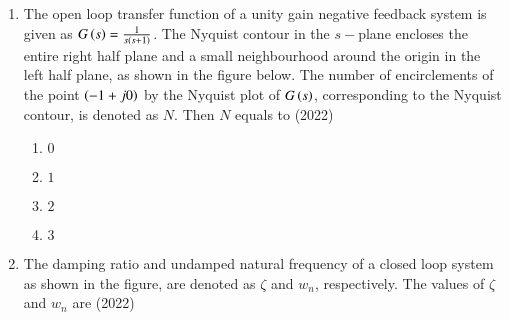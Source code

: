 \documentclass[journal]{IEEEtran}
\begin{document}
\begin{enumerate}
\item The open loop transfer function of a unity gain negative feedback system is given as $G\left(s\right)=\frac{1}{s\left(s+1\right)}$. The Nyquist contour in the $s-$plane encloses the entire right half plane and a small neighbourhood around the origin in the left half plane, as shown in the figure below. The number of encirclements of the point $\left(-1+j0\right)$ by the Nyquist plot of $G\left(s\right)$, corresponding to the Nyquist contour, is denoted as $N$. Then $N$ equals to \hfill(2022)

\begin{multicols}{2}
\begin{enumerate}
\item $0$
\item $1$
\item $2$
\item $3$
\end{enumerate}
\end{multicols}


\item The damping ratio and undamped natural frequency of a closed loop system as shown in the figure, are denoted as $\zeta$ and $w_{n}$, respectively. The values of $\zeta$ and $w_{n}$ are \hfill(2022)


\end{enumerate}
\end{document}
